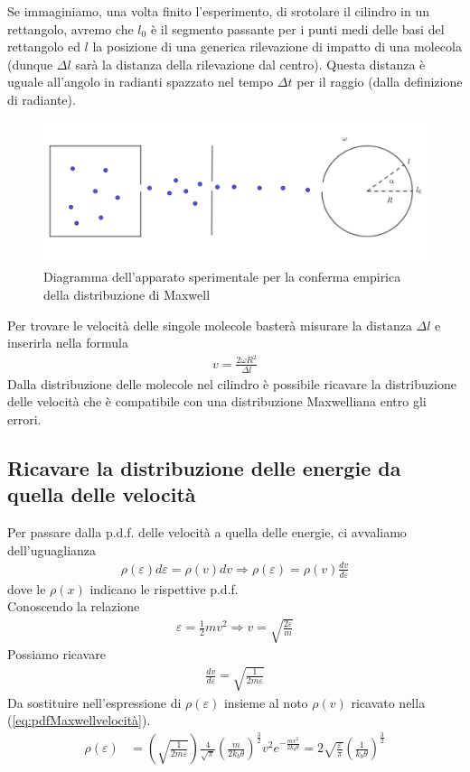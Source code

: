 \documentclass[10pt,a4paper]{article}
\begin{document}
Se immaginiamo, una volta finito l'esperimento, di srotolare il cilindro in un rettangolo, avremo che $l_0$ è il segmento passante per i punti medi delle basi del rettangolo ed $l$ la posizione di una generica rilevazione di impatto di una molecola (dunque $\Delta l$ sarà la distanza della rilevazione dal centro).  Questa distanza è uguale all'angolo in radianti spazzato nel tempo $\Delta t$ per il raggio (dalla definizione di radiante).
\begin{figure}[h!]
	\centering
	\includegraphics[width=0.9\linewidth]{../images/Esperimento_Maxwell}
	\caption{Diagramma dell'apparato sperimentale per la conferma empirica della distribuzione di Maxwell}
	\label{fig:esperimentomaxwell}
\end{figure}
\FloatBarrier
Per trovare le velocità delle singole molecole basterà misurare la distanza $\Delta l$ e inserirla nella formula
\begin{align*}
	v = \frac{2\omega R^2}{\Delta l}
\end{align*}
Dalla distribuzione delle molecole nel cilindro è possibile ricavare la distribuzione delle velocità che è compatibile con una distribuzione Maxwelliana entro gli errori.
\subsection{Ricavare la distribuzione delle energie da quella delle velocità}
Per passare dalla p.d.f. delle velocità a quella delle energie, ci avvaliamo dell'uguaglianza
\begin{align*}
	\rho(\varepsilon)d\varepsilon = \rho(v)dv \Rightarrow \rho(\varepsilon) = \rho(v)\frac{dv}{d\varepsilon}
\end{align*}
dove le $\rho(x)$ indicano le rispettive p.d.f.\\
Conoscendo la relazione
\begin{align*}
	\varepsilon = \frac{1}{2}m v ^2 \Rightarrow v = \sqrt{\frac{2 \varepsilon}{m}}
\end{align*}
Possiamo ricavare 
\begin{align*}
	\frac{dv}{d\varepsilon} = \sqrt{\frac{1}{2 m \varepsilon}}
\end{align*}
Da sostituire nell'espressione di $\rho(\varepsilon)$ insieme al noto $\rho(v)$ ricavato nella (\ref{eq:pdfMaxwellvelocità}).
\begin{align*}
	\rho(\varepsilon)&= \left(\sqrt{\frac{1}{2 m \varepsilon}}\right) \frac{4}{\sqrt{\pi}}\left(\frac{m}{2k_b\theta}\right)^{\frac{3}{2}} v^2 e^{-\frac{mv^2}{2 k_b \theta}}= 2 \sqrt{\frac{\varepsilon}{\pi}} \left(\frac{1}{k_b \theta}\right)^{\frac{3}{2}}
\end{align*} 
\end{document}
